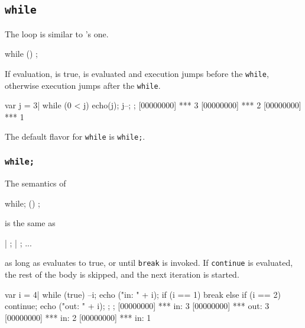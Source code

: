 \subsection{\lstinline{while}}
\label{sec:lang:while}


The  loop is similar to \langC's one.

\begin{urbiunchecked}
while ()
  ;
\end{urbiunchecked}

If  evaluation, is true,  is evaluated and
execution jumps before the \lstinline{while}, otherwise execution
jumps after the \lstinline{while}.

\begin{urbiscript}
var j = 3|
while (0 < j)
{
  echo(j);
  j--;
};
[00000000] *** 3
[00000000] *** 2
[00000000] *** 1
\end{urbiscript}

The default flavor for \lstinline{while} is \lstinline|while;|.

\subsubsection{\lstinline{while;}}

The semantics of

\begin{urbiunchecked}
while; ()
  ;
\end{urbiunchecked}

\noindent
is the same as

\begin{urbiunchecked}
 |  ;  |  ; ...
\end{urbiunchecked}

\noindent
as long as  evaluates to true, or until \lstinline{break} is
invoked.  If \lstinline{continue} is evaluated, the rest of the body
is skipped, and the next iteration is started.

\begin{urbiscript}
{
  var i = 4|
  while (true)
  {
    --i;
    echo ("in: " + i);
    if (i == 1)
      break
    else if (i == 2)
      continue;
    echo ("out: " + i);
  };
};
[00000000] *** in: 3
[00000000] *** out: 3
[00000000] *** in: 2
[00000000] *** in: 1
\end{urbiscript}



